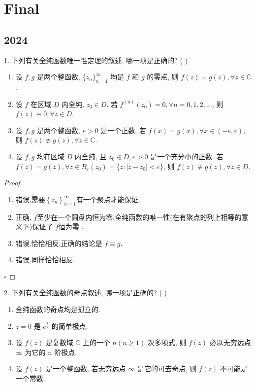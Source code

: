 \documentclass[../../复变函数.tex]{subfiles}
\begin{document}
\chapter{ Final }

\section{2024}

 \begin{problem}
1. 下列有关全纯函数唯一性定理的叙述, 哪一项是正确的? ( )
\begin{enumerate}
    \item 设 $f, g$ 是两个整函数, $\{z_n\}_{n=1}^\infty$ 均是 $f$ 和 $g$ 的零点, 则 $f(z) = g(z), \forall z \in \mathbb{C}$.
    \item 设 $f$ 在区域 $D$ 内全纯, $z_0 \in D$. 若 $f^{(n)}(z_0) = 0, \forall n = 0, 1, 2, \dots$, 则 $f(z) \equiv 0, \forall z \in D$.
    \item 设 $f, g$ 是两个整函数, $\varepsilon > 0$ 是一个正数, 若 $f(x) = g(x), \forall x \in (-\varepsilon, \varepsilon)$, 则 $f(z) \not\equiv g(z), \forall z \in \mathbb{C}$.
    \item 设 $f, g$ 均在区域 $D$ 内全纯, 且 $z_0 \in D, \varepsilon > 0$ 是一个充分小的正数. 若 $f(z) = g(z), \forall z \in B_\varepsilon(z_0) = \{z: |z - z_0| < \varepsilon\}$, 则 $f(z) \not\equiv g(z), \forall z \in D$.
\end{enumerate}
\end{problem}
\begin{proof}
  \begin{enumerate}
    \item 错误,需要\(  \left\{ z_{n} \right\}_{n = 1}^{\infty}  \)有一个聚点才能保证.
    \item 正确, \(  f  \)至少在一个圆盘内恒为零,全纯函数的唯一性(在有聚点的列上相等的意义下)保证了 \(  f  \)恒为零 . 
    \item 错误,恰恰相反,正确的结论是 \(  f\equiv g  \).
    \item 错误,同样恰恰相反. 
  \end{enumerate}
  

  \hfill $\square$
\end{proof}
\begin{problem}
2. 下列有关全纯函数的奇点叙述, 哪一项是正确的? ( )
\begin{enumerate}
    \item 全纯函数的奇点均是孤立的.
    \item $z = 0$ 是 $e^{\frac{1}{z}}$ 的简单极点.
    \item 设 $f(z)$ 是复数域 $\mathbb{C}$ 上的一个 $n(n \ge 1)$ 次多项式, 则 $f(z)$ 必以无穷远点 $\infty$ 为它的 $n$ 阶极点.
    \item 设 $f(z)$ 是一个整函数, 若无穷远点 $\infty$ 是它的可去奇点, 则 $f(z)$ 不可能是一个常数.
\end{enumerate}
\end{problem}
\end{document}
